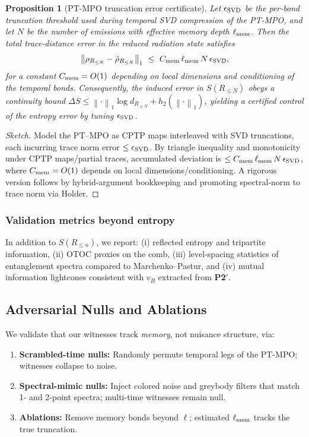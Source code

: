 \documentclass[11pt,a4paper]{article}
\newcommand{\PtwoPrime}{\textbf{P2$'$}\xspace}
\newcommand{\ellmem}{\ensuremath{\ell_{\mathrm{mem}}}}
\theoremstyle{plain}
\newtheorem{proposition}[theorem]{Proposition}
\theoremstyle{definition}
\theoremstyle{remark}
\begin{document}
\begin{proposition}[PT-MPO truncation error certificate]\label{prop:error}
Let $\epsilon_{\rm SVD}$ be the per-bond truncation threshold used during temporal SVD compression of the PT-MPO, and let $N$ be the number of emissions with effective memory depth $\ell_{\rm mem}$. Then the total trace-distance error in the reduced radiation state satisfies
\[
\left\|\rho_{R_{\le N}} - \tilde{\rho}_{R_{\le N}}\right\|_1 \ \le\ C_{\rm mem}\, \ell_{\rm mem}\, N\, \epsilon_{\rm SVD},
\]
for a constant $C_{\rm mem}=O(1)$ depending on local dimensions and conditioning of the temporal bonds. Consequently, the induced error in $S(R_{\le N})$ obeys a continuity bound $\Delta S \le \left\|\cdot\right\|_1 \log d_{R_{\le N}}+h_2(\left\|\cdot\right\|_1)$, yielding a certified control of the entropy error by tuning $\epsilon_{\rm SVD}$.
\end{proposition}
\begin{proof}[Sketch]
Model the PT--MPO as CPTP maps interleaved with SVD truncations, each incurring trace norm error $\le \epsilon_{\rm SVD}$. By triangle inequality and monotonicity under CPTP maps/partial traces, accumulated deviation is $\le C_{\rm mem}\,\ellmem\,N\,\epsilon_{\rm SVD}$, where $C_{\rm mem}=O(1)$ depends on local dimensions/conditioning. A rigorous version follows by hybrid-argument bookkeeping and promoting spectral-norm to trace norm via Holder.
\end{proof}

\subsubsection{Validation metrics beyond entropy}
In addition to $S(R_{\le n})$, we report: (i) reflected entropy and tripartite information, (ii) OTOC proxies on the comb, (iii) level-spacing statistics of entanglement spectra compared to Marchenko--Pastur, and (iv) mutual information lightcones consistent with $v_B$ extracted from \PtwoPrime.

\subsection{Adversarial Nulls and Ablations}
\label{subsec:adversarial}
We validate that our witnesses track \emph{memory}, not nuisance structure, via:
\begin{enumerate}[leftmargin=*,label=(\roman*)]
\item \textbf{Scrambled-time nulls:} Randomly permute temporal legs of the PT-MPO; witnesses collapse to noise.
\item \textbf{Spectral-mimic nulls:} Inject colored noise and greybody filters that match 1- and 2-point spectra; multi-time witnesses remain null.
\item \textbf{Ablations:} Remove memory bonds beyond $\ell$; estimated $\ell_{\rm mem}$ tracks the true truncation.
\end{enumerate}
\end{document}
